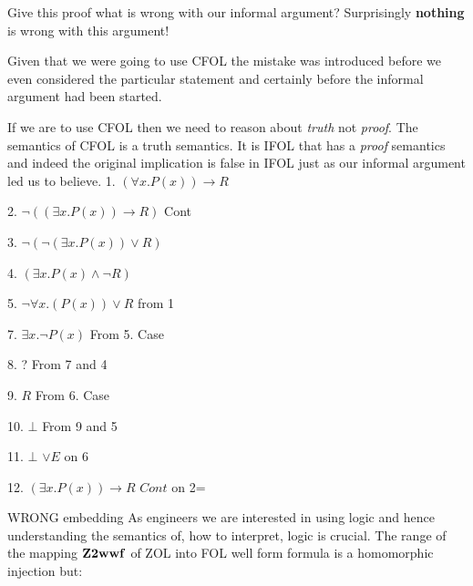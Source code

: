 Give this proof what is wrong with our informal argument?
Surprisingly    {\bf nothing} is wrong with this argument! 

Given that we were going to use CFOL the mistake was introduced   before we even considered the particular statement and certainly before the informal argument had been started. 

If we are to use CFOL then  we need to reason about \emph{truth} not \emph{proof}.  The semantics of CFOL is a truth semantics. It is IFOL that has a \emph{proof} semantics and indeed the original implication is false in IFOL just as our informal argument led us to believe.
1. $(\forall x. P(x))  \rightarrow R$ 

2. \hspace{2em} $\neg ((\exists x.  P(x))\rightarrow R)$ \hspace{\fill} Cont

3. \hspace{2em} $ \neg (\neg (\exists x. P(x))\vee  R)$

4. \hspace{2em} $(\exists  x.  P(x)\wedge  \neg R)$

5.  \hspace{2em} $\neg \forall x.  (P(x)) \vee  R$  \hspace{\fill} from 1

7. \hspace{4em}    $\exists x.  \neg P(x)$  \hspace{\fill} From 5. Case

8.  \hspace{4em} ?  \hspace{\fill} From 7 and 4

9. \hspace{4em}    $R$  \hspace{\fill} From 6. Case

10.  \hspace{4em} $\bot$  \hspace{\fill} From 9 and 5

11. \hspace{2em} $\bot$ \hspace{\fill} $\vee E$ on 6

12. $(\exists x.  P(x))\rightarrow R$ \hspace{\fill}  $Cont$ on 2=



WRONG embedding
As engineers we are interested in using logic and hence understanding the semantics of, how to interpret, logic is crucial. The range of the mapping ${\bf Z2wwf}$ of ZOL into  FOL well form formula is a homomorphic injection but:

